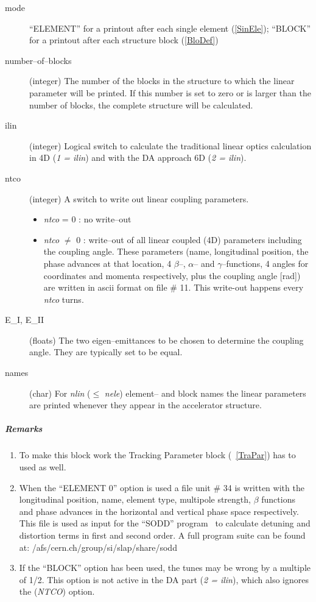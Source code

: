 \begin{description}
\item [mode] ``ELEMENT'' for a printout after each single element
  (\ref{SinEle}); ``BLOCK'' for a printout after each structure block
  (\ref{BloDef})
\item [number--of--blocks] (integer) The number of the blocks in the
  structure to which the linear parameter will be printed. If this
  number is set to zero or is larger than the number of blocks, the
  complete structure will be calculated.
\item [ilin] (integer) Logical switch to calculate the traditional
  linear optics calculation in 4D ({\it 1 = ilin}) and with the DA
  approach 6D ({\it 2 = ilin}).
\item [ntco] (integer) A switch to write out linear coupling
  parameters.
 \begin{itemize}
 \item {\em ntco} \/= 0 : no write--out
 \item {\em ntco} \/$\neq$ 0 : write--out of all linear coupled (4D)
   parameters including the coupling angle.  These parameters (name,
   longitudinal position, the phase advances at that location, 4
   $\beta$--, $\alpha$-- and $\gamma$--functions, 4 angles for
   coordinates and momenta respectively, plus the coupling angle
   [rad]) are written in ascii format on file \# 11.
   This write-out happens every \emph{ntco} turns.
 \end{itemize}
\item [E\_I, E\_II] (floats) The two eigen--emittances to be chosen to
  determine the coupling angle. They are typically set to be equal.
\item [names] (char) For {\em nlin} \/($\leq $ {\em nele}\/) element--
  and block names the linear parameters are printed whenever they
  appear in the accelerator structure.
\end{description}

\subparagraph{Remarks}
\begin{enumerate}
\item To make this block work the Tracking Parameter block
  (~\ref{TraPar}) has to used as well.
\item When the ``ELEMENT 0'' option is used a file unit \# 34 is
  written with the longitudinal position, name, element type,
  multipole strength, $\beta$ functions and phase advances in the
  horizontal and vertical phase space respectively. This file is used
  as input for the ``SODD'' program~\cite{SODD} to calculate detuning
  and distortion terms in first and second order. A full program suite
  can be found at: /afs/cern.ch/group/si/slap/share/sodd
\item If the ``BLOCK'' option has been used, the tunes may be wrong by
  a multiple of 1/2. This option is not active in the DA part ({\it 2
    = ilin}), which also ignores the ({\it NTCO}) option.
\end{enumerate}

